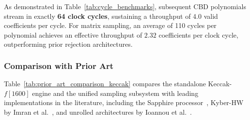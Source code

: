 As demonstrated in Table~\ref{tab:cycle_benchmarks}, subsequent CBD polynomials stream in exactly \textbf{64 clock cycles}, sustaining a throughput of 4.0 valid coefficients per cycle. For matrix sampling, an average of 110 cycles per polynomial achieves an effective throughput of $2.32$ coefficients per clock cycle, outperforming prior rejection architectures.

\subsubsection{Comparison with Prior Art}
Table~\ref{tab:prior_art_comparison_keccak} compares the standalone Keccak-$f[1600]$ engine and the unified sampling subsystem with leading implementations in the literature, including the Sapphire processor~\cite{banerjee2021sapphire}, Kyber-HW by Imran et al.~\cite{imran2022tvlsi}, and unrolled architectures by Ioannou et al.~\cite{keccak_unroll_2020}.

